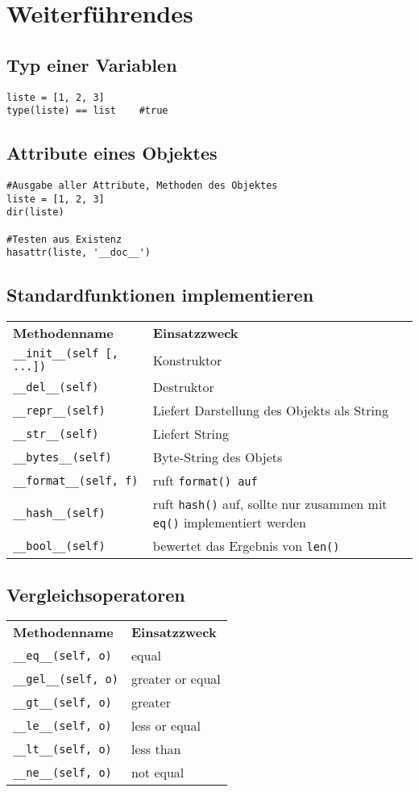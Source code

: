 \chapter{Weiterführendes}
\section{Typ einer Variablen}
\begin{lstlisting}
liste = [1, 2, 3]
type(liste) == list    #true
\end{lstlisting}
\section{Attribute eines Objektes}
\begin{lstlisting}
#Ausgabe aller Attribute, Methoden des Objektes
liste = [1, 2, 3]
dir(liste)

#Testen aus Existenz
hasattr(liste, '__doc__')
\end{lstlisting}
\section{Standardfunktionen implementieren}
\begin{tabular}{lp{8cm}}
\textbf{Methodenname}		&\textbf{Einsatzzweck}\\
\texttt{\_\_init\_\_(self [, ...])}	&Konstruktor\\
\texttt{\_\_del\_\_(self)}		&Destruktor\\
\texttt{\_\_repr\_\_(self)}		&Liefert Darstellung des Objekts als String\\
\texttt{\_\_str\_\_(self)}		&Liefert String\\
\texttt{\_\_bytes\_\_(self)}		&Byte-String des Objets\\
\texttt{\_\_format\_\_(self, f)}	&ruft \texttt{format() auf}\\
\texttt{\_\_hash\_\_(self)}		&ruft \texttt{hash()} auf, sollte nur zusammen mit \texttt{eq()} implementiert werden\\
\texttt{\_\_bool\_\_(self)}		&bewertet das Ergebnis von \texttt{len()}\\
\end{tabular}
\section{Vergleichsoperatoren}
\begin{tabular}{lp{8cm}}
\textbf{Methodenname}		&\textbf{Einsatzzweck}\\
\texttt{\_\_eq\_\_(self, o)}	&equal\\
\texttt{\_\_gel\_\_(self, o)}		&greater or equal\\
\texttt{\_\_gt\_\_(self, o)}		&greater\\
\texttt{\_\_le\_\_(self, o)}		&less or equal\\
\texttt{\_\_lt\_\_(self, o)}		&less than\\
\texttt{\_\_ne\_\_(self, o)}		&not equal\\
\end{tabular}
